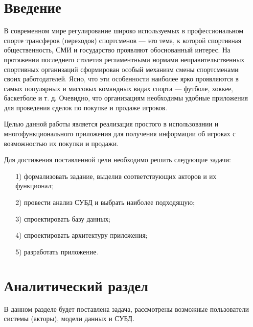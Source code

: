 
\usepackage{enumitem}
\usepackage{kosrem}
\usepackage{gensymb}
\usepackage{tempora}






\setcounter{page}{3}

\clearpage
\tableofcontents

\clearpage
\section*{Введение}
В современном мире регулирование широко используемых в профессиональном спорте трансферов (переходов) спортсменов — это тема, к которой спортивная общественность, СМИ и государство проявляют обоснованный интерес. На протяжении последнего столетия регламентными нормами неправительственных спортивных организаций сформирован особый механизм смены спортсменами своих работодателей. Ясно, что эти особенности наиболее ярко проявляются в самых популярных и массовых командных видах спорта — футболе, хоккее, баскетболе и т. д. Очевидно, что организациям необходимы удобные приложения для проведения сделок по покупке и продаже игроков.

Целью данной работы является реализация простого в использовании и многофункционального приложения для получения информации об игроках с возможностью их покупки и продажи.

Для достижения поставленной цели необходимо решить следующие задачи:
\begin{itemize}
	\item[1)] формализовать задание, выделив соответствующих акторов и их функционал;
	\item[2)] провести анализ СУБД и выбрать наиболее подходящую;
	\item[3)] спроектировать базу данных;
	\item[4)] спроектировать архитектуру приложения;
	\item[5)] разработать приложение.
\end{itemize}

\clearpage
\section{Аналитический раздел}
В данном разделе будет поставлена задача, рассмотрены возможные пользователи системы (акторы), модели данных и СУБД.

